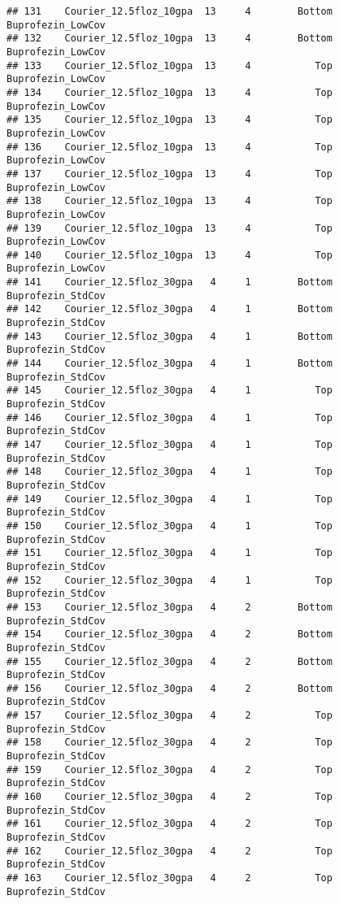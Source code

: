 \documentclass[
]{article}
\begin{document}
\begin{verbatim}
## 131    Courier_12.5floz_10gpa  13     4        Bottom      Buprofezin_LowCov
## 132    Courier_12.5floz_10gpa  13     4        Bottom      Buprofezin_LowCov
## 133    Courier_12.5floz_10gpa  13     4           Top      Buprofezin_LowCov
## 134    Courier_12.5floz_10gpa  13     4           Top      Buprofezin_LowCov
## 135    Courier_12.5floz_10gpa  13     4           Top      Buprofezin_LowCov
## 136    Courier_12.5floz_10gpa  13     4           Top      Buprofezin_LowCov
## 137    Courier_12.5floz_10gpa  13     4           Top      Buprofezin_LowCov
## 138    Courier_12.5floz_10gpa  13     4           Top      Buprofezin_LowCov
## 139    Courier_12.5floz_10gpa  13     4           Top      Buprofezin_LowCov
## 140    Courier_12.5floz_10gpa  13     4           Top      Buprofezin_LowCov
## 141    Courier_12.5floz_30gpa   4     1        Bottom      Buprofezin_StdCov
## 142    Courier_12.5floz_30gpa   4     1        Bottom      Buprofezin_StdCov
## 143    Courier_12.5floz_30gpa   4     1        Bottom      Buprofezin_StdCov
## 144    Courier_12.5floz_30gpa   4     1        Bottom      Buprofezin_StdCov
## 145    Courier_12.5floz_30gpa   4     1           Top      Buprofezin_StdCov
## 146    Courier_12.5floz_30gpa   4     1           Top      Buprofezin_StdCov
## 147    Courier_12.5floz_30gpa   4     1           Top      Buprofezin_StdCov
## 148    Courier_12.5floz_30gpa   4     1           Top      Buprofezin_StdCov
## 149    Courier_12.5floz_30gpa   4     1           Top      Buprofezin_StdCov
## 150    Courier_12.5floz_30gpa   4     1           Top      Buprofezin_StdCov
## 151    Courier_12.5floz_30gpa   4     1           Top      Buprofezin_StdCov
## 152    Courier_12.5floz_30gpa   4     1           Top      Buprofezin_StdCov
## 153    Courier_12.5floz_30gpa   4     2        Bottom      Buprofezin_StdCov
## 154    Courier_12.5floz_30gpa   4     2        Bottom      Buprofezin_StdCov
## 155    Courier_12.5floz_30gpa   4     2        Bottom      Buprofezin_StdCov
## 156    Courier_12.5floz_30gpa   4     2        Bottom      Buprofezin_StdCov
## 157    Courier_12.5floz_30gpa   4     2           Top      Buprofezin_StdCov
## 158    Courier_12.5floz_30gpa   4     2           Top      Buprofezin_StdCov
## 159    Courier_12.5floz_30gpa   4     2           Top      Buprofezin_StdCov
## 160    Courier_12.5floz_30gpa   4     2           Top      Buprofezin_StdCov
## 161    Courier_12.5floz_30gpa   4     2           Top      Buprofezin_StdCov
## 162    Courier_12.5floz_30gpa   4     2           Top      Buprofezin_StdCov
## 163    Courier_12.5floz_30gpa   4     2           Top      Buprofezin_StdCov

\end{verbatim}
\end{document}
